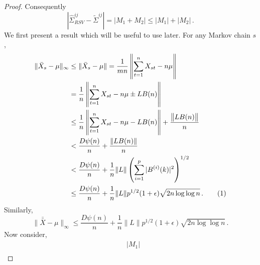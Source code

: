 \documentclass[11pt]{article}
\newcommand\numberthis{\addtocounter{equation}{1}\tag{\theequation}}
\theoremstyle{remark}
\begin{document}
\begin{proof}
Consequently
\[
\left|\hat{\Sigma}_{RSV}^{ij} - \tilde{\Sigma}^{ij}  \right| = |M_1 + M_2| \leq |M_1| + |M_2|\,.
\]
%
We first present a result which will be useful to use later. For any Markov chain $s$, 
\begin{align*}
  \|\bar{X}_s - \mu\|_{\infty} & \leq \|\bar{X}_s - \mu\| = \dfrac{1}{mn}\left\|\sum_{t=1}^{n}X_{st} - n\mu\right\| \\
  &= \dfrac{1}{n}  \left \|\sum_{t=1}^{n}X_{st} - n\mu \pm L B(n) \right\|\\
  & \leq \dfrac{1}{n}\left\|\sum_{t=1}^{n}X_{st} - n \mu - L B(n)\right\| + \dfrac{\left\|L B(n)\right\|}{n}\\
  &< \dfrac{D\psi(n)}{n} + \dfrac{\|L B(n)\|}{n}\\
  &< \dfrac{D\psi(n)}{n} + \dfrac{1}{n}\|L\| \left(\sum\limits_{i=1}^{p}|B^{(i)}(k)|^2\right)^{1/2}\\
  & \leq \dfrac{D\psi(n)}{n} + \dfrac{1}{n}\|L\| p^{1/2}(1+\epsilon)\sqrt{2n \log\log n}\,. \numberthis \label{eq:xbars_bound}
\end{align*}
 Similarly,
 \begin{equation}
\label{eq:xbarbar_bound}
   \| \bar{\bar{X}} - \mu\|_{\infty} \leq \dfrac{D\psi(n)}{n} + \dfrac{1}{n}\|L\| p^{1/2}(1+\epsilon)\sqrt{2n \log\log n}\,.
\end{equation}
%
Now consider,
\begin{align*}
& |M_1| \\ 

\end{align*}
\end{proof}
\end{document}
